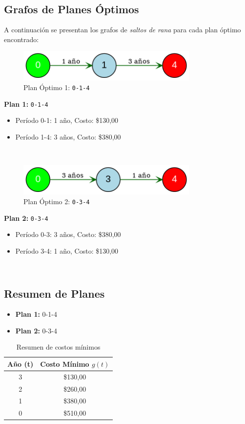 \documentclass[12pt]{article}
\begin{document}
\subsection*{Grafos de Planes Óptimos}
A continuación se presentan los grafos de \emph{saltos de rana} para cada plan óptimo encontrado:\\

\begin{figure}[H]
\centering
\includegraphics[width=0.8\textwidth]{ReemplazoEquipos1_plan_1.png}
\caption{Plan Óptimo 1: \texttt{0-1-4}}
\label{fig:plan1}
\end{figure}

\textbf{Plan 1:} \texttt{0-1-4}\\
\begin{itemize}\small
\item Período 0-1: 1 año, Costo: \$130,00
\item Período 1-4: 3 años, Costo: \$380,00
\end{itemize}
\\
\begin{figure}[H]
\centering
\includegraphics[width=0.8\textwidth]{ReemplazoEquipos1_plan_2.png}
\caption{Plan Óptimo 2: \texttt{0-3-4}}
\label{fig:plan2}
\end{figure}

\textbf{Plan 2:} \texttt{0-3-4}\\
\begin{itemize}\small
\item Período 0-3: 3 años, Costo: \$380,00
\item Período 3-4: 1 año, Costo: \$130,00
\end{itemize}
\\
\subsection*{Resumen de Planes}
\begin{itemize}
\item \textbf{Plan 1:} 0-1-4
\item \textbf{Plan 2:} 0-3-4
\end{itemize}
\begin{table}[H]
\centering
\caption{Resumen de costos mínimos}
\begin{tabular}{cc}
\toprule
Año (t) & Costo Mínimo $g(t)$ \\
\midrule
3 & \$130,00 \\
2 & \$260,00 \\
1 & \$380,00 \\
0 & \$510,00 \\
\bottomrule
\end{tabular}
\end{table}
\end{document}
